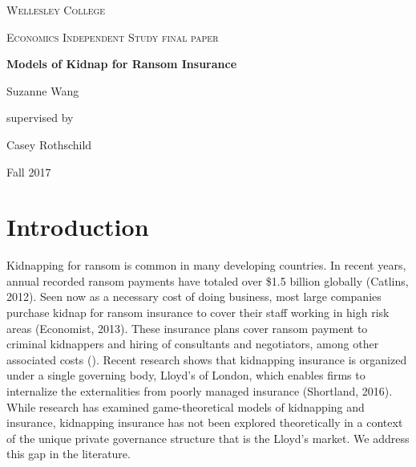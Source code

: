 \documentclass[12pt]{article}
\begin{document}
 

\begin{titlepage}
  \centering
  {\scshape\LARGE Wellesley College \par}
  \vspace{1cm}
  {\scshape\Large Economics Independent Study final paper\par}
  \vspace{3cm}
  {\huge\bfseries Models of Kidnap for Ransom Insurance\par}
  \vspace{2.5cm}
  {\Large Suzanne Wang\par}
  supervised by\par
    {\large Casey Rothschild\par}

  \vfill

  {\large Fall 2017\par}
\end{titlepage}

\section{Introduction}

Kidnapping for ransom is common in many developing countries. In recent years, annual recorded ransom payments have totaled over \$1.5 billion globally (Catlins, 2012). Seen now as a necessary cost of doing business, most large companies purchase kidnap for ransom insurance to cover their staff working in high risk areas (Economist, 2013). These insurance plans cover ransom payment to criminal kidnappers and hiring of consultants and negotiators, among other associated costs (). Recent research shows that kidnapping insurance is organized under a single governing body, Lloyd's of London, which enables firms to internalize the externalities from poorly managed insurance (Shortland, 2016). While research has examined game-theoretical models of kidnapping and insurance, kidnapping insurance has not been explored theoretically in a context of the unique private governance structure that is the Lloyd's market. We address this gap in the literature.
\end{document}
